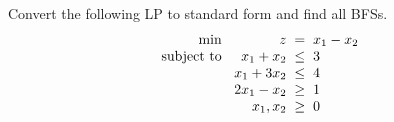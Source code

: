 \documentclass[a4paper, 10pt]{article}
\begin{document}
\begin{problem}
Convert the following LP to standard form and find all BFSs.
\[
\begin{array}{@{\hspace{2mm}} r @{\hspace{2mm}} r @{\hspace{2mm}} c @{\hspace{2mm}} l}
    \text{min } & z & = & x_1 - x_2 \\
    \text{subject to } & x_1 + x_2 & \leq & 3 \\
    & x_1 + 3x_2 & \leq & 4 \\
    & 2x_1 - x_2 & \geq & 1 \\
    & x_1, x_2 & \geq & 0
\end{array}
\]
\end{problem}
\end{document}
